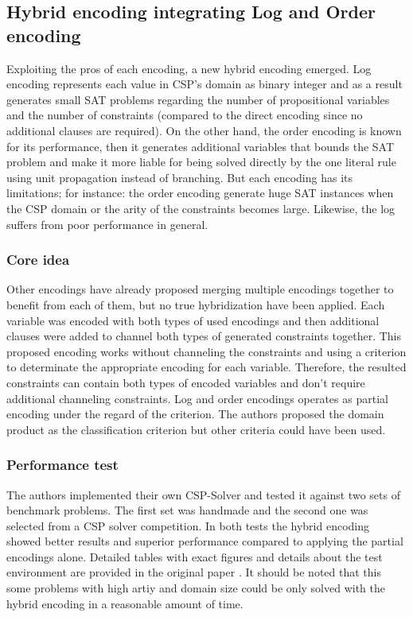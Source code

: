 \subsection{Hybrid encoding integrating Log and Order encoding}
Exploiting the pros of each encoding, a new hybrid encoding emerged. Log encoding represents each value in CSP's domain as binary integer and as a result generates small SAT problems regarding the number of propositional variables and the number of constraints (compared to the direct encoding since no additional clauses are required). On the other hand, the order encoding is known for its performance, then it generates additional variables that bounds the SAT problem and make it more liable for being solved directly by the one literal rule using unit propagation instead of branching. But each encoding has its limitations; for instance: the order encoding generate huge SAT instances when the CSP domain or the arity of the constraints becomes large. Likewise, the log suffers from poor performance in general.

\subsubsection{Core idea}
Other encodings have already proposed merging multiple encodings together to benefit from each of them, but no true hybridization have been applied. Each variable was encoded with both types of used encodings and then additional clauses were added to channel both types of generated constraints together. This proposed encoding works without channeling the constraints and using a criterion to determinate the appropriate encoding for each variable. Therefore, the resulted constraints can contain both types of encoded variables and don't require additional channeling constraints. Log and order encodings operates as partial encoding under the regard of the criterion. The authors proposed the domain product as the classification criterion but other criteria could have been used. \cite{soh2015hybrid}

\subsubsection{Performance test}
The authors implemented their own CSP-Solver and tested it against two sets of benchmark problems. The first set was handmade and the second one was selected from a CSP solver competition. In both tests the hybrid encoding showed better results and superior performance compared to applying the partial encodings alone. Detailed tables with exact figures and details about the test environment are provided in the original paper \cite{soh2015hybrid}. It should be noted that this some problems with high artiy and domain size could be only solved with the hybrid encoding in a reasonable amount of time.


